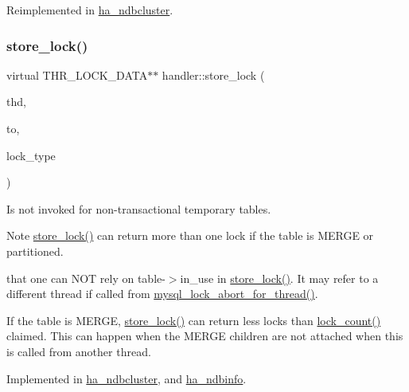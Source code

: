 Reimplemented in \mbox{\hyperlink{classha__ndbcluster_a55b76e2e6595d838981a54951aa3f002}{ha\+\_\+ndbcluster}}.

\mbox{\label{classhandler_a2502e460566f2c4b506cc1b30eb79e0a}} 
\subsubsection{\texorpdfstring{store\+\_\+lock()}{store\_lock()}}
{\footnotesize\ttfamily virtual T\+H\+R\+\_\+\+L\+O\+C\+K\+\_\+\+D\+A\+TA$\ast$$\ast$ handler\+::store\+\_\+lock (\begin{DoxyParamCaption}\item[{T\+HD $\ast$}]{thd,  }\item[{T\+H\+R\+\_\+\+L\+O\+C\+K\+\_\+\+D\+A\+TA $\ast$$\ast$}]{to,  }\item[{enum thr\+\_\+lock\+\_\+type}]{lock\+\_\+type }\end{DoxyParamCaption})\hspace{0.3cm}{\ttfamily [pure virtual]}}

Is not invoked for non-\/transactional temporary tables.

\begin{DoxyNote}{Note}
\mbox{\hyperlink{classhandler_a2502e460566f2c4b506cc1b30eb79e0a}{store\+\_\+lock()}} can return more than one lock if the table is M\+E\+R\+GE or partitioned.

that one can N\+OT rely on table-\/$>$in\+\_\+use in \mbox{\hyperlink{classhandler_a2502e460566f2c4b506cc1b30eb79e0a}{store\+\_\+lock()}}. It may refer to a different thread if called from \mbox{\hyperlink{group__Locking_gad2320fa808c9d6523790e796d57e2331}{mysql\+\_\+lock\+\_\+abort\+\_\+for\+\_\+thread()}}.

If the table is M\+E\+R\+GE, \mbox{\hyperlink{classhandler_a2502e460566f2c4b506cc1b30eb79e0a}{store\+\_\+lock()}} can return less locks than \mbox{\hyperlink{classhandler_a2447668275a831bcf73b5c00818254a6}{lock\+\_\+count()}} claimed. This can happen when the M\+E\+R\+GE children are not attached when this is called from another thread. 
\end{DoxyNote}


Implemented in \mbox{\hyperlink{classha__ndbcluster_a5bc14d2819ddbc2d616e11db49d669de}{ha\+\_\+ndbcluster}}, and \mbox{\hyperlink{classha__ndbinfo_a7169a09db353528ca14a979b01e56eb6}{ha\+\_\+ndbinfo}}.

